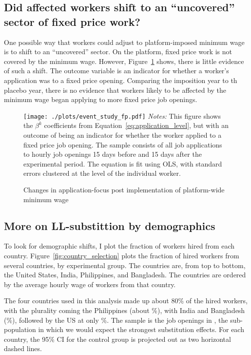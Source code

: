 \subsection{Did affected workers shift to an ``uncovered'' sector of fixed price work?} \label{sec:shift_fp}
One possible way that workers could adjust to platform-imposed minimum wage is to shift to an ``uncovered'' sector. 
On the platform, fixed price work is not covered by the minimum wage. 
However, Figure~\ref{fig:event_study_fp} shows, there is little evidence of such a shift. 
The outcome variable is an indicator for whether a worker's application was to a fixed price opening. 
Comparing the imposition year to th placebo year, there is no evidence that workers likely to be affected by the minimum wage began applying to more fixed price job openings.  

\begin{figure}[ht]
\centering 
\caption{Changes in application-focus post implementation of platform-wide minimum wage \label{fig:event_study_fp}} 
\begin{minipage}{0.95 \textwidth}
  \texttt{[image: ./plots/event\_study\_fp.pdf]}
{\footnotesize
  \emph{Notes:} This figure shows the $\beta^k$ coefficients from Equation~\ref{eq:application_level}, but with an outcome of being an indicator for whether the worker applied to a fixed price job opening.  
   The sample consists of all job applications to hourly job openings 15 days before and 15 days after the experimental period. 
   The equation is fit using OLS, with standard errors clustered at the level of the individual worker. 
}
\end{minipage} 
\end{figure}

\subsection{More on LL-substittion by demographics}

To look for demographic shifts, I plot the fraction of workers hired from each country.
Figure~\ref{fig:country_selection} plots the fraction of hired workers from several countries, by experimental group.
The countries are, from top to bottom, the United States, India, Philippines, and Bangladesh.
The countries are ordered by the average hourly wage of workers from that country. 

The four countries used in this analysis made up about 80\% of the hired workers, with the plurality coming the Philippines (about \PHILfractionControl{}\%), with India and Bangladesh (\BANGfractionControl{}\%), followed by the US at only \USfractionControl{}\%. 
The sample is the job openings in \lpw{}, the sub-population in which we would expect the strongest substitution effects.
For each country, the 95\% CI for the control group is projected out as two horizontal dashed lines. 

